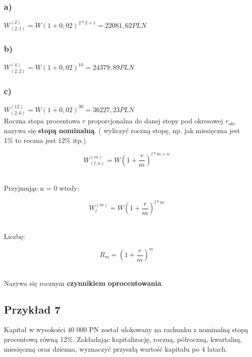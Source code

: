 \documentclass{article}
\begin{document}
\subsubsection{a)}
$ W^{(2)}_{(2, 1)} = W(1 + 0,02)^{2 * 2 + 1} = 22 081,62 PLN $\\
\subsubsection{b)}
$ W^{(4)}_{(2, 2)} = W(1 + 0,02)^{10} = 24 379,89 PLN $\\
\subsubsection{c)}
$ W^{(12)}_{(2, 6)} = W(1 + 0,02)^{30} = 36 227,23 PLN $\\

Roczna stopa procentowa $ r $ proporcjonalna do danej stopy pod okresowej $ r_{okr} $ nazywa się \textbf{stopą nominalną}. ( wyliczyć roczną stopę, np. jak miesięczna jest 1\% to roczna jest 12\% itp.)

\begin{center}
	\begin{equation}
		W^{(m)}_{(l, n)} = W(1 + \frac{r}{m})^{l*m+n}
	\end{equation}
\end{center}\\

Przyjmując n = 0 wtedy:\\

\begin{center}
	\begin{equation}
		W^{(m)}_{l} = W(1 + \frac{r}{m})^{l*m}
	\end{equation}
\end{center}\\

Liczbę:\\

\begin{center}
	\begin{equation}
		R_m = (1 + \frac{r}{m})^m
	\end{equation}
\end{center}\\

Nazywa się rocznym \textbf{czynnikiem oprocentowania}.

\subsection{Przykład 7}
Kapitał w wysokości 40 000 PN został ulokowany na rachunku z nominalną stopą procentową równą 12\%. Zakładając kapitalizację, roczną, półroczną, kwartalną, miesięczną oraz dzienna, wyznaczyć przyszłą wartość kapitału po 4 latach.\\
\end{document}
